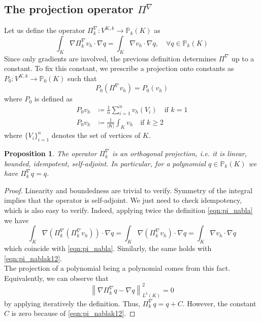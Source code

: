 \documentclass[10pt]{article}
\newcommand{\norm}[2]{\left\lVert#1\right\rVert_{#2}}
\newtheorem{prop}{Proposition}
\begin{document}
\subsection{The projection operator $\Pi^\nabla$}
Let us define the operator $\Pi_k^\nabla : V^{K,k} \rightarrow \mathbb{P}_k(K)$ as
\begin{equation}
	\int_K \nabla \Pi_k^\nabla v_h \cdot \nabla q = \int_K \nabla v_h \cdot \nabla q, \quad \forall q \in \mathbb{P}_k(K)
	\label{eqn:pi_nabla}
\end{equation}
Since only gradients are involved, the previous definition determines $\Pi^\nabla$ up to a constant. To fix this constant, we prescribe a projection onto constants as $P_0: V^{K,k} \rightarrow \mathbb{P}_0(K)$ such that
\begin{equation}
	P_0(\Pi^\nabla v_h) = P_0(v_h)
	\label{eqn:pi_nabla0}
\end{equation} 
where $P_0$ is defined as
\begin{subequations}
	\begin{align}
		P_0 v_h &\coloneqq \frac{1}{n} \sum_{i=1}^{n} v_h(V_i) \quad \text{if $k=1$} \label{eqn:pi_nablak1}
		\\
		P_0 v_h &\coloneqq \frac{1}{|K|} \int_{K} v_h \quad \text{if $k\geq 2$} \label{eqn:pi_nablak2}
	\end{align}
	\label{eqn:pi_nablak12}
\end{subequations}
where $\lbrace V_i \rbrace_{i=1}^n$ denotes the set of vertices of $K$. \\
\begin{prop}
	The operator $\Pi_k^\nabla$ is an orthogonal projection, i.e. it is linear, bounded, idempotent, self-adjoint. In particular, for a polynomial $q \in \mathbb{P}_k(K)$ we have $\Pi_k^\nabla q = q$.
	\label{prop:pi_nabla}
\end{prop}
\begin{proof}
	Linearity and boundedness are trivial to verify. Symmetry of the integral implies that the operator is self-adjoint. We just need to check idempotency, which is also easy to verify. Indeed, applying twice the definition \eqref{eqn:pi_nabla} we have
	$$\int_{K} \nabla (\Pi_k^\nabla(\Pi_k^\nabla v_h)) \cdot \nabla q = \int_{K} \nabla (\Pi_k^\nabla v_h) \cdot \nabla q = \int_K \nabla v_h \cdot \nabla q$$
	which coincide with \eqref{eqn:pi_nabla}. Similarly, the same holds with \eqref{eqn:pi_nablak12}.\\
	The projection of a polynomial being a polynomial comes from this fact. Equivalently, we can observe that
	$$\norm{\nabla \Pi_k^\nabla q- \nabla q}{L^2(K)}^2=0$$
	by applying iteratively the definition. Thus, $\Pi_k^\nabla q = q + C$. However, the constant $C$ is zero because of \eqref{eqn:pi_nablak12}. 
\end{proof}
\end{document}
